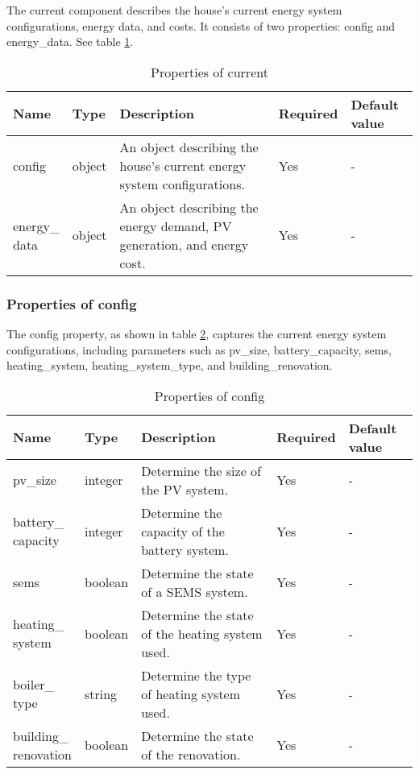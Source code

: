 The current component describes the house's current energy system configurations, energy data, and costs. 
It consists of two properties: config and energy\_data. 
See table \ref{tab:properties_current}.

\begin{table}[h!]
    \centering
    \small
    \begin{tabular}{ | p{} | p{} | p{} | p{} | p{} | } 
    \hline
    Name & Type & Description & Required & Default value \\
    \hline
    config & object & An object describing the house's current energy system configurations. & Yes & - \\
    \hline
    \makecell{energy\_\\data} & object & An object describing the energy demand, PV generation, and energy cost. & Yes & - \\
    \hline
    \end{tabular}
    \caption{Properties of current}
    \label{tab:properties_current}
\end{table}


\subsubsection{Properties of config}

The config property, as shown in table \ref{tab:properties_config}, captures the current energy system configurations, including parameters such as pv\_size, battery\_capacity, sems, heating\_system, heating\_system\_type, and building\_renovation.

\begin{table}[h!]
    \centering
    \small
    \begin{tabular}{ | p{} | p{} | p{} | p{} | p{} | } 
    \hline
    Name & Type & Description & Required & Default value \\
    \hline
    pv\_size & integer & Determine the size of the PV system. & Yes & - \\
    \hline
    \makecell{battery\_\\capacity} & integer & Determine the capacity of the battery system. & Yes & - \\
    \hline
    sems & boolean & Determine the state of a SEMS system. & Yes & - \\
    \hline
    \makecell{heating\_\\system} & boolean & Determine the state of the heating system used.	 & Yes & - \\
    \hline
    \makecell{boiler\_\\type} & string & Determine the type of heating system used. & Yes & - \\
    \hline
    \makecell{building\_\\renovation} & boolean & Determine the state of the renovation. & Yes & - \\
    \hline
    \end{tabular}
    \caption{Properties of config}
    \label{tab:properties_config}
\end{table}


